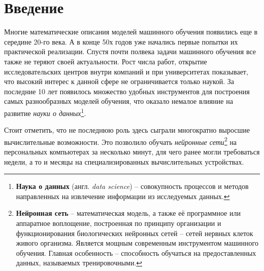 \documentclass[11pt,a4paper]{extarticle}
\begin{document}
\newpage
\tableofcontents
\newpage

\section{Введение}\label{sec:intro}

	Многие математические описания моделей машинного обучения появились еще в середине 20-го века.
	А в конце 50х годов уже начались первые попытки их практической реализации.
	Спустя почти полвека задачи машинного обучения все также не теряют своей актуальности.
	Рост числа работ, открытие исследовательских центров внутри компаний и при университетах показывает,
	что высокий интерес к данной сфере не ограничивается только наукой.
	За последние 10 лет появилось множество удобных инструментов для построения самых разнообразных моделей обучения, что оказало немалое влияние на развитие \textit{науки о данных}\footnote{
		\textbf{Наука о данных} (англ. \textit{data science}) -- совокупность процессов и методов направленных на извлечение информации из исследуемых данных.
	}.  
	
	Стоит отметить, что не последнюю роль здесь сыграли многократно выросшие вычислительные возможности. 
	Это позволило обучать \textit{нейронные сети}\footnote{
		\textbf{Нейронная сеть} --  математическая модель, а также её программное или аппаратное воплощение, 
		построенная по принципу организации и функционирования биологических нейронных сетей -- сетей нервных клеток живого организма.
		Является мощным современным инструментом машинного обучения.
		Главная особенность -- способность обучаться на предоставленных данных, называемых тренировочными.
	} на персональных компьютерах за несколько минут, для чего ранее могли требоваться недели, а то и месяцы на специализированных вычислительных устройствах.
\end{document}
